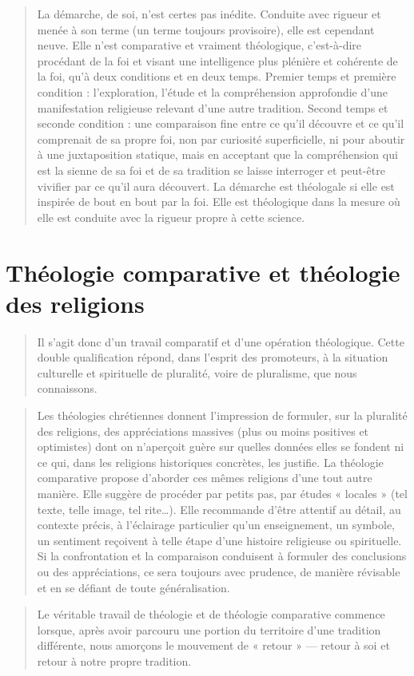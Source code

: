  \begin{quote}
        La démarche, de soi, n’est certes pas inédite. Conduite avec rigueur et menée à son terme (un terme toujours provisoire), elle est cependant neuve. Elle n’est comparative et vraiment théologique, c’est-à-dire procédant de la foi et visant une intelligence plus plénière et cohérente de la foi, qu’à deux conditions et en deux temps. Premier temps et première condition : l’exploration, l’étude et la compréhension approfondie d’une manifestation religieuse relevant d’une autre tradition. Second temps et seconde condition : une comparaison fine entre ce qu’il découvre et ce qu’il comprenait de sa propre foi, non par curiosité superficielle, ni pour aboutir à une juxtaposition statique, mais en acceptant que la compréhension qui est la sienne de sa foi et de sa tradition se laisse interroger et peut-être vivifier par ce qu’il aura découvert. La démarche est théologale si elle est inspirée de bout en bout par la foi. Elle est théologique dans la mesure où elle est conduite avec la rigueur propre à cette science.
\end{quote}




 \section{Théologie comparative et théologie des religions}
 

 \begin{quote}
        Il s’agit donc d’un travail comparatif et d’une opération théologique. Cette double qualification répond, dans l’esprit des promoteurs, à la situation culturelle et spirituelle de pluralité, voire de pluralisme, que nous connaissons.
\end{quote}

\begin{quote}
        Les théologies chrétiennes donnent l’impression de formuler, sur la pluralité des religions, des appréciations massives (plus ou moins positives et optimistes) dont on n’aperçoit guère sur quelles données elles se fondent ni ce qui, dans les religions historiques concrètes, les justifie. La théologie comparative propose d’aborder ces mêmes religions d’une tout autre manière. Elle suggère de procéder par petits pas, par études « locales » (tel texte, telle image, tel rite…). Elle recommande d’être attentif au détail, au contexte précis, à l’éclairage particulier qu’un enseignement, un symbole, un sentiment reçoivent à telle étape d’une histoire religieuse ou spirituelle. Si la confrontation et la comparaison conduisent à formuler des conclusions ou des appréciations, ce sera toujours avec prudence, de manière révisable et en se défiant de toute généralisation.
\end{quote}
\begin{quote}
        Le véritable travail de théologie et de théologie comparative commence lorsque, après avoir parcouru une portion du territoire d’une tradition différente, nous amorçons le mouvement de « retour » — retour à soi et retour à notre propre tradition.
\end{quote}

